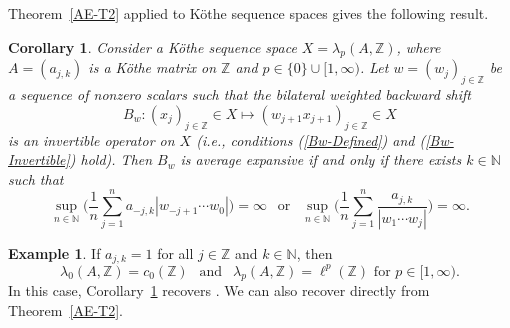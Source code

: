 \documentclass[12pt]{amsart}
\theoremstyle{theorem}
\newtheorem{corollary}[theorem]{Corollary}
\theoremstyle{definition}
\newtheorem{example}[theorem]{Example}
\theoremstyle{remark} \theoremstyle{question} \theoremstyle{example}
\newcommand{\N}{\mathbb{N}}   %
\newcommand{\Z}{\mathbb{Z}}   %
\begin{document}
Theorem~\ref{AE-T2} applied to K\"othe sequence spaces gives the following result.

\begin{corollary}\label{AE-C1}
Consider a K\"othe sequence space $X = \lambda_p(A,\Z)$, where $A = (a_{j,k})$ is a K\"othe matrix on $\Z$ 
and $p \in \{0\} \cup [1,\infty)$. 
Let $w = (w_j)_{j \in \Z}$ be a sequence of nonzero scalars such that the bilateral weighted backward shift
\[
B_w : (x_j)_{j \in \Z} \in X \mapsto (w_{j+1}x_{j+1})_{j \in \Z} \in X
\]
is an invertible operator on $X$ (i.e., conditions (\ref{Bw-Defined}) and (\ref{Bw-Invertible}) hold). 
Then $B_w$ is average expansive if and only if there exists $k \in \N$ such that
\begin{equation}\label{AE-F3}
\sup_{n \in \N} \Big(\frac{1}{n} \sum_{j=1}^n a_{-j,k}|w_{-j+1} \cdots w_0|\Big) = \infty \ \ \text{ or } \ \
\sup_{n \in \N} \Big(\frac{1}{n} \sum_{j=1}^n \frac{a_{j,k}}{|w_1 \cdots w_j|}\Big) = \infty.
\end{equation}
\end{corollary}

\begin{example}
If $a_{j,k} = 1$ for all $j \in \Z$ and $k \in \N$, then
\[
\lambda_0(A,\Z) = c_0(\Z) \ \ \text{ and } \ \ \lambda_p(A,\Z) = \ell^p(\Z) \text{ for } p \in [1,\infty).
\]
In this case, Corollary~\ref{AE-C1} recovers \cite[Proposition~15]{AlvBerMes21}.
We can also recover \cite[Proposition~15]{AlvBerMes21} directly from Theorem~\ref{AE-T2}.
\end{example}
\end{document}
